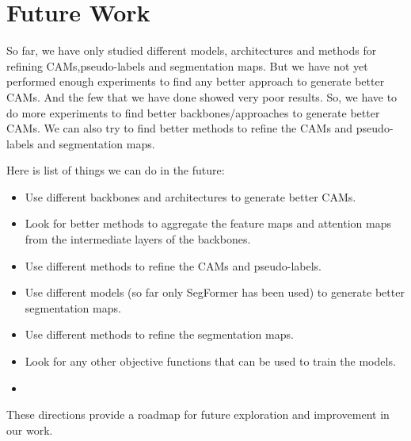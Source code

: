 \section*{Future Work}
\label{sec:future}

So far, we have only studied different models, architectures and methods for refining CAMs,pseudo-labels and segmentation maps. But we have not yet performed enough experiments to find any better approach to generate better CAMs. And the few that we have done showed very poor results. So, we have to do more experiments to find better backbones/approaches to generate better CAMs. We can also try to find better methods to refine the CAMs and pseudo-labels and segmentation maps.

Here is list of things we can do in the future:

\begin{itemize}
    \item Use different backbones and architectures to generate better CAMs.
    \item Look for better methods to aggregate the feature maps and attention maps from the intermediate layers of the backbones.
    \item Use different methods to refine the CAMs and pseudo-labels.
    \item Use different models (so far only SegFormer \cite{fsss_segformer} has been used) to generate better segmentation maps.
    \item Use different methods to refine the segmentation maps.
    \item Look for any other objective functions that can be used to train the models.
    \item 
\end{itemize}

These directions provide a roadmap for future exploration and improvement in our work.